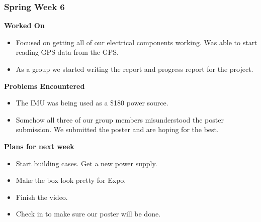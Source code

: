 \documentclass[compsoc,draftclsnofoot,onecolumn,10pt]{IEEEtran}
\begin{document}
\subsubsection*{Spring Week 6}
\textbf{Worked On}
\begin{itemize}
    \item Focused on getting all of our electrical components working. Was able to start reading GPS data from the GPS.
    \item As a group we started writing the report and progress report for the project.
\end{itemize}
\textbf{Problems Encountered}
\begin{itemize}
    \item The IMU was being used as a \$180 power source.
    \item Somehow all three of our group members misunderstood the poster submission.
    We submitted the poster and are hoping for the best.
\end{itemize}
\textbf{Plans for next week}
\begin{itemize}
    \item Start building cases. Get a new power supply.
    \item Make the box look pretty for Expo.
    \item Finish the video.
    \item Check in to make sure our poster will be done.
\end{itemize}
\end{document}
